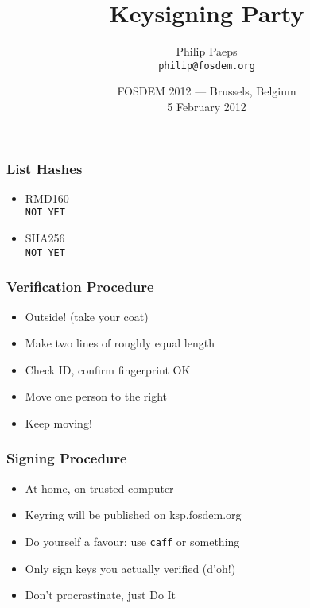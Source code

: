 \documentclass{beamer}
\title{Keysigning Party}
\author[Philip Paeps]{Philip Paeps \\ {\tt philip@fosdem.org}}
\date[FOSDEM 2012]{FOSDEM 2012 --- Brussels, Belgium \\ 5 February 2012}
\begin{document}
\begin{frame}[plain]
    \titlepage
    \begin{center}
    \end{center}
\end{frame}

\begin{frame}
    \frametitle{List Hashes}

    \begin{itemize}
    \item RMD160 \\ {\tt NOT YET}
    \vfill
    \item SHA256 \\ {\tt NOT YET}
    \end{itemize}
\end{frame}

\begin{frame}
    \frametitle{Verification Procedure}

    \begin{itemize}
    \item Outside! (take your coat)
    \item Make two lines of roughly equal length
    \item Check ID, confirm fingerprint OK
    \item Move one person to the right
    \item Keep moving!
    \end{itemize}
\end{frame}

\begin{frame}
    \frametitle{Signing Procedure}

    \begin{itemize}
    \item At home, on trusted computer
    \item Keyring will be published on ksp.fosdem.org
    \item Do yourself a favour: use {\tt caff} or something
    \item Only sign keys you actually verified (d'oh!)
    \item Don't procrastinate, just Do It\texttrademark
    \end{itemize}
\end{frame}
\end{document}
